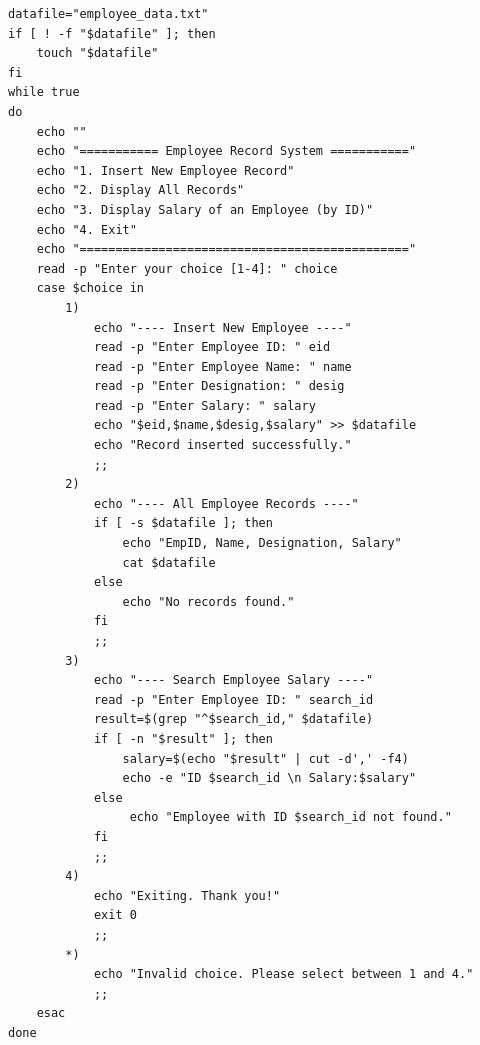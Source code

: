\begin{verbatim}
datafile="employee_data.txt"
if [ ! -f "$datafile" ]; then
    touch "$datafile"
fi
while true
do
    echo ""
    echo "=========== Employee Record System ==========="
    echo "1. Insert New Employee Record"
    echo "2. Display All Records"
    echo "3. Display Salary of an Employee (by ID)"
    echo "4. Exit"
    echo "=============================================="
    read -p "Enter your choice [1-4]: " choice
    case $choice in
        1)
            echo "---- Insert New Employee ----"
            read -p "Enter Employee ID: " eid
            read -p "Enter Employee Name: " name
            read -p "Enter Designation: " desig
            read -p "Enter Salary: " salary
            echo "$eid,$name,$desig,$salary" >> $datafile
            echo "Record inserted successfully."
            ;;
        2)
            echo "---- All Employee Records ----"
            if [ -s $datafile ]; then
                echo "EmpID, Name, Designation, Salary"
                cat $datafile
            else
                echo "No records found."
            fi
            ;;
        3)
            echo "---- Search Employee Salary ----"
            read -p "Enter Employee ID: " search_id
            result=$(grep "^$search_id," $datafile)
            if [ -n "$result" ]; then
                salary=$(echo "$result" | cut -d',' -f4)
                echo -e "ID $search_id \n Salary:$salary"
            else
                 echo "Employee with ID $search_id not found."
            fi
            ;;
        4)
            echo "Exiting. Thank you!"
            exit 0
            ;;
        *)
            echo "Invalid choice. Please select between 1 and 4."
            ;;
    esac
done
\end{verbatim}